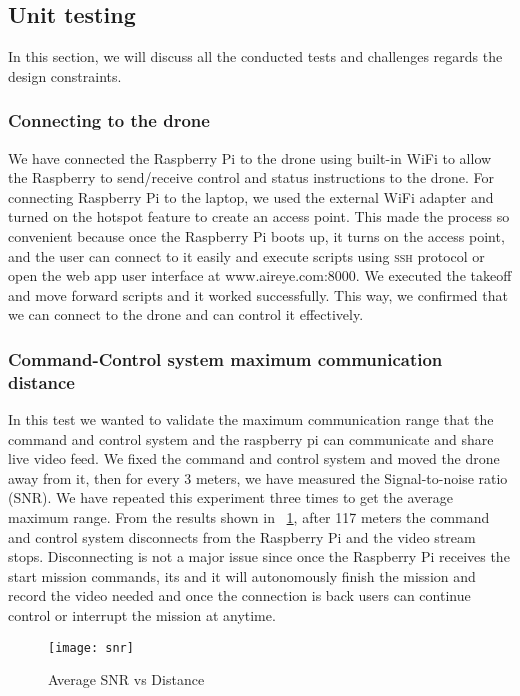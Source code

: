 \documentclass[../main.tex]{subfiles}
\begin{document}

\subsection{Unit testing}
In this section, we will discuss all the conducted tests 
and challenges regards the design constraints. 

\subsubsection{Connecting to the drone}

We have connected the
Raspberry Pi to the drone using built-in WiFi
to allow the Raspberry to send/receive control and status 
instructions to the drone. 
For connecting Raspberry Pi to the laptop, 
we used the external WiFi adapter and turned 
on the hotspot feature to create an access point.
This made the process so convenient because 
once the Raspberry Pi boots up, it turns on the 
access point, and the user can connect to it 
easily and execute scripts using \textsc{ssh} 
protocol or open the web app user interface 
at www.aireye.com:8000. We executed the takeoff 
and move forward scripts and it worked successfully.
This way, we confirmed that we can connect to the drone and can control it effectively.

\subsubsection{Command-Control system maximum communication distance}

In this test we wanted to validate the maximum communication range that
the command and control system and the raspberry pi can communicate
and share live video feed. We fixed the command and control system and moved
the drone away from it, then for every 3 meters, we have measured the Signal-to-noise ratio (SNR).
We have repeated this experiment three times to get the average maximum range.
From the results shown in ~\ref{fig:snr-vs-distance}, after 117 meters 
the command and control system disconnects from the Raspberry Pi
and the video stream stops. Disconnecting is not a major issue
since once the Raspberry Pi receives the start mission commands, its 
and it will autonomously finish the mission and record the video needed
and once the connection is back users can continue control or interrupt the mission
at anytime.
 
\begin{figure}[!t]
	\centering
	\texttt{[image: snr]}
	\caption{Average SNR vs Distance}
	\label{fig:snr-vs-distance}
\end{figure}
\end{document}
